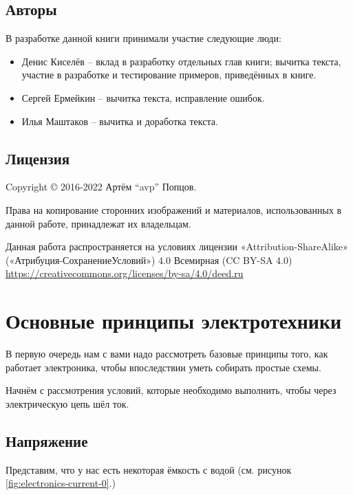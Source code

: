 \documentclass[a4paper,twoside]{book}
\begin{document}
\section{Авторы}
В разработке данной книги принимали участие следующие люди:
\begin{itemize}
\item Денис Киселёв -- вклад в разработку отдельных глав книги; вычитка текста,
  участие в разработке и тестирование примеров, приведённых в книге.
\item Сергей Ермейкин -- вычитка текста, исправление ошибок.
\item Илья Маштаков – вычитка и доработка текста.
\end{itemize}

\section{Лицензия}
Copyright © 2016-2022 Артём ``avp'' Попцов.

Права на копирование сторонних изображений и материалов, использованных в данной
работе, принадлежат их владельцам.

Данная работа распространяется на условиях лицензии «Attribution-ShareAlike»
(«Атрибуция-СохранениеУсловий») 4.0 Всемирная (CC BY-SA 4.0)
\url{https://creativecommons.org/licenses/by-sa/4.0/deed.ru}

\chapter{Основные принципы электротехники}

В первую очередь нам с вами надо рассмотреть базовые принципы того, как работает
электроника, чтобы впоследствии уметь собирать простые схемы.

Начнём с рассмотрения условий, которые необходимо выполнить, чтобы через
электрическую цепь шёл ток.

\section{Напряжение}

Представим, что у нас есть некоторая ёмкость с водой (см. рисунок
\ref{fig:electronics-current-0}.)
\end{document}
